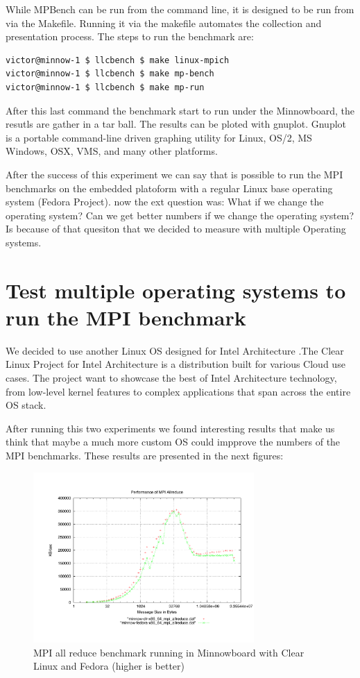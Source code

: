 While MPBench can be run from the command line, it is designed to be run from
via the Makefile. Running it via the makefile automates the collection and
presentation process. The steps to run the benchmark are: 


\begin{lstlisting}[frame=single,language=bash]
victor@minnow-1 $ llcbench $ make linux-mpich
victor@minnow-1 $ llcbench $ make mp-bench
victor@minnow-1 $ llcbench $ make mp-run
\end{lstlisting}

After this last command the benchmark start to run under the Minnowboard, the
resutls are gather in a tar ball. The results can be ploted with gnuplot.
Gnuplot is a portable command-line driven graphing utility for Linux, OS/2, MS
Windows, OSX, VMS, and many other platforms. 

After the success of this experiment we can say that is possible to run the MPI
benchmarks on the embedded platoform with a regular Linux base operating system
(Fedora Project). now the ext question was: What if we change the operating
system? Can we get better numbers if we change the operating system? Is because
of that quesiton that we decided to measure with multiple Operating systems.


\section{Test multiple operating systems to run the MPI benchmark}

We decided to use another Linux OS designed for Intel Architecture
\cite{clear-linux}.The Clear Linux Project for Intel Architecture is a
distribution built for various Cloud use cases. The project  want to showcase
the best of Intel Architecture technology, from low-level kernel features to
complex applications that span across the entire OS stack.

After running this two experiments we found interesting results that make us
think that maybe a much more custom OS could impprove the numbers of the MPI
benchmarks. These results are presented in the next figures:

\begin{figure}[H]
\centering
\includegraphics[width=0.75\textwidth]{images/mpbench_clr_experiments/mpi_allreduce.pdf}
\caption{MPI all reduce benchmark running in Minnowboard with Clear Linux and
Fedora (higher is better)}
\label{fig:5.1}
\end{figure}



